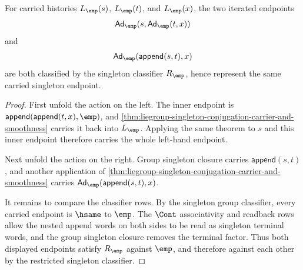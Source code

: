 \begin{theorem}
\label{thm:liegroup-singleton-conjugation-action-law}
For carried histories $L_{\emp}(s)$, $L_{\emp}(t)$, and $L_{\emp}(x)$, the two
iterated endpoints
$$
\mathsf{Ad}_{\emp}(s,\mathsf{Ad}_{\emp}(t,x))
$$
and
$$
\mathsf{Ad}_{\emp}(\mathsf{append}(s,t),x)
$$
are both classified by the singleton classifier $R_{\emp}$, hence represent the
same carried singleton endpoint.
\end{theorem}
\begin{proof}
First unfold the action on the left. The inner endpoint is
$\mathsf{append}(\mathsf{append}(t,x),\emp)$, and
\autoref{thm:liegroup-singleton-conjugation-carrier-and-smoothness} carries it
back into $L_{\emp}$. Applying the same theorem to $s$ and this inner endpoint
therefore carries the whole left-hand endpoint.

Next unfold the action on the right. Group singleton closure carries
$\mathsf{append}(s,t)$, and another application of
\autoref{thm:liegroup-singleton-conjugation-carrier-and-smoothness} carries
$\mathsf{Ad}_{\emp}(\mathsf{append}(s,t),x)$.

It remains to compare the classifier rows. By the singleton group classifier,
every carried endpoint is $\hsame$ to $\emp$. The $\Cont$ associativity and
readback rows allow the nested append words on both sides to be read as
singleton terminal words, and the group singleton closure removes the terminal
factor. Thus both displayed endpoints satisfy $R_{\emp}$ against $\emp$, and
therefore against each other by the restricted singleton classifier.
\end{proof}

